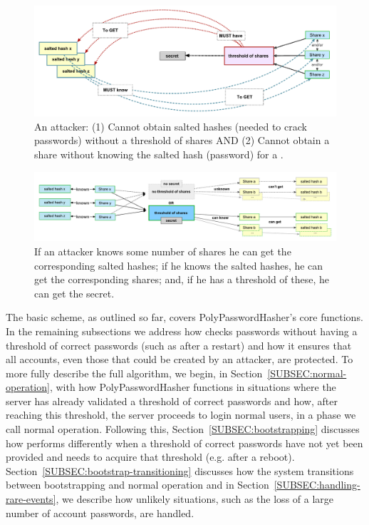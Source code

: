 \begin{figure}
    \includegraphics[width=1\linewidth]{./images/pph-interdependency-2.pdf}
    \caption{An attacker: (1) Cannot obtain salted hashes (needed to crack
    passwords) without a threshold  of shares AND (2) Cannot obtain a share without
    knowing the salted hash (password) for a \thresholdaccount.}
    \label{FIGURE:pph-interdependency-2}
\end{figure}

\begin{figure}
    \includegraphics[width=1\linewidth]{./images/pph-interdependency-new.pdf}
    \caption{If an attacker knows some number of shares he can get the
    corresponding salted hashes; if he knows the salted hashes, he can get the
    corresponding shares; and, if he has a threshold of these, he can get the
    secret.}
    \label{FIGURE:pph-interdependency-new}
\end{figure}
    
The basic scheme, as outlined so far, covers PolyPasswordHasher’s core 
functions.  In the remaining subsections we address how \PPH checks passwords 
without having a threshold of correct passwords (such as after a restart) and 
how it ensures that all
accounts, even those that could be created by an attacker, are protected.  To
more fully describe the full \PPH algorithm, we begin, in
Section~\ref{SUBSEC:normal-operation}, with how PolyPasswordHasher functions in
situations where the server has already validated a threshold of correct
passwords and how, after reaching this threshold, the server proceeds to login
normal users, in a phase we call normal operation.  Following this,
Section~\ref{SUBSEC:bootstrapping} discusses how \PPH performs differently when
a threshold of correct passwords have not yet been provided and needs to
acquire that threshold (e.g. after a reboot).
Section~\ref{SUBSEC:bootstrap-transitioning} discusses how the system
transitions between bootstrapping and normal operation and in
Section~\ref{SUBSEC:handling-rare-events}, we describe how unlikely situations,
such as the loss of a large number of account passwords, are handled.

